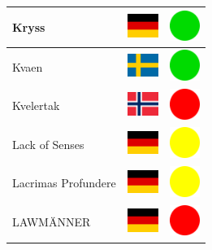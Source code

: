 \documentclass[12pt, a4paper, twoside]{report}
\begin{document}
\begin{center}
\begin{longtable}{|p{5cm}|p{2cm}|p{2cm}|}
 Kryss                                                      & \includegraphics[width=1cm]{../4x3/de} &   \includegraphics[width=1cm]{../likes/y} \\ \hline
 Kvaen                                                      & \includegraphics[width=1cm]{../4x3/se} &   \includegraphics[width=1cm]{../likes/y} \\ \hline
 Kvelertak                                                  & \includegraphics[width=1cm]{../4x3/no} &   \includegraphics[width=1cm]{../likes/n} \\ \hline
 Lack of Senses                                             & \includegraphics[width=1cm]{../4x3/de} &   \includegraphics[width=1cm]{../likes/m} \\ \hline
 Lacrimas Profundere                                        & \includegraphics[width=1cm]{../4x3/de} &   \includegraphics[width=1cm]{../likes/m} \\ \hline
 LAWMÄNNER                                                  & \includegraphics[width=1cm]{../4x3/de} &   \includegraphics[width=1cm]{../likes/n} \\ \hline

\end{longtable}
\end{center}
\end{document}
